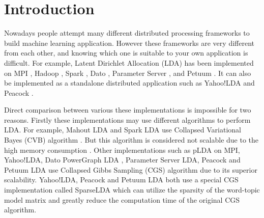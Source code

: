 \documentclass[conference]{IEEEtran}
\begin{document}
\section{Introduction}
Nowadays people attempt many different distributed processing frameworks 
to build machine learning application.
However these frameworks are very different from each other,
and knowing which one is suitable to your own application is difficult.
For example, Latent Dirichlet Allocation (LDA) \cite{1} has been implemented
on MPI \cite{2}, Hadoop \cite{3}, Spark \cite{4}, Dato \cite{5},
Parameter Server \cite{6}, and Petuum \cite{7}. 
It can also be implemented as a standalone distributed application
such as Yahoo!LDA \cite{8} and Peacock \cite{9}. 

Direct comparison between
various these implementations is impossible for two reasons.
Firstly these implementations may use different algorithms to perform LDA.
For example, Mahout LDA \cite{10} and Spark LDA \cite{11} 
use Collapsed Variational Bayes (CVB) algorithm \cite{1}. 
But this algorithm is considered not scalable
due to the high memory consumption \cite{12}.
Other implementations such as
pLDA \cite{13} on MPI, Yahoo!LDA, Dato PowerGraph LDA \cite{14},
Parameter Server LDA, Peacock and Petuum LDA \cite{15}
use Collapsed Gibbs Sampling (CGS) algorithm \cite{16}
due to its superior scalability.
Yahoo!LDA, Peacock and Petuum LDA both
use a special CGS implementation called SparseLDA \cite{17}
which can utilize the sparsity of the word-topic model matrix 
and greatly reduce the computation time of the original CGS algorithm.
\end{document}
